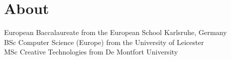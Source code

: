 
\pagestyle{empty}

\chapter{About}
\label{about}


European Baccalaureate from the European School Karlsruhe, Germany\\
BSc Computer Science (Europe) from the University of Leicester\\
MSc Creative Technologies from De Montfort University

\clearpage
